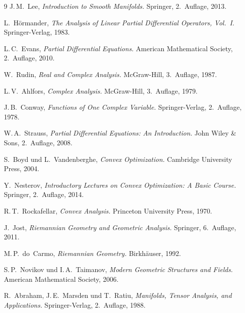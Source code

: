 ﻿\documentclass[12pt, a4paper]{article}
\theoremstyle{definition}
\begin{document}
\begin{thebibliography}{9}
		J.\,M.~Lee,
		\newblock \emph{Introduction to Smooth Manifolds.}
		\newblock Springer, 2.~Auflage, 2013.
		
		L.~Hörmander,
		\newblock \emph{The Analysis of Linear Partial Differential Operators, Vol.~I.}
		\newblock Springer-Verlag, 1983.
		
		L.\,C.~Evans,
		\newblock \emph{Partial Differential Equations.}
		\newblock American Mathematical Society, 2.~Auflage, 2010.
		
		W.~Rudin,
		\newblock \emph{Real and Complex Analysis.}
		\newblock McGraw-Hill, 3.~Auflage, 1987.
		
		L.\,V.~Ahlfors,
		\newblock \emph{Complex Analysis.}
		\newblock McGraw-Hill, 3.~Auflage, 1979.
		
		J.\,B.~Conway,
		\newblock \emph{Functions of One Complex Variable.}
		\newblock Springer-Verlag, 2.~Auflage, 1978.
		
		W.\,A.~Strauss,
		\newblock \emph{Partial Differential Equations: An Introduction.}
		\newblock John Wiley \& Sons, 2.~Auflage, 2008.
		
		S.~Boyd und L.~Vandenberghe,
		\newblock \emph{Convex Optimization.}
		\newblock Cambridge University Press, 2004.
		
		Y.~Nesterov,
		\newblock \emph{Introductory Lectures on Convex Optimization: A Basic Course.}
		\newblock Springer, 2.~Auflage, 2014.
		
		R.\,T.~Rockafellar,
		\newblock \emph{Convex Analysis.}
		\newblock Princeton University Press, 1970.
		
		J.~Jost,
		\newblock \emph{Riemannian Geometry and Geometric Analysis.}
		\newblock Springer, 6.~Auflage, 2011.
		
		M.\,P.~do~Carmo,
		\newblock \emph{Riemannian Geometry.}
		\newblock Birkhäuser, 1992.
		
		S.\,P.~Novikov und I.\,A.~Taimanov,
		\newblock \emph{Modern Geometric Structures and Fields.}
		\newblock American Mathematical Society, 2006.
		
		R.~Abraham, J.\,E.~Marsden und T.~Ratiu,
		\newblock \emph{Manifolds, Tensor Analysis, and Applications.}
		\newblock Springer-Verlag, 2.~Auflage, 1988.
		

\end{thebibliography}
\end{document}
